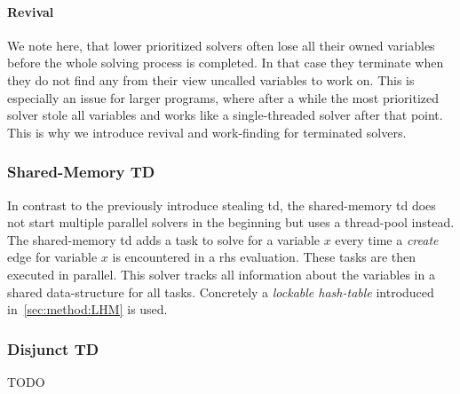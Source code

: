     \paragraph{Revival} We note here, that lower prioritized solvers often lose all their owned variables before the whole solving process is completed. In that case they terminate when they do not find any from their view uncalled variables to work on. This is especially an issue for larger programs, where after a while the most prioritized solver stole all variables and works like a single-threaded solver after that point. This is why we introduce revival and work-finding for terminated solvers.

    \subsubsection{Shared-Memory TD}
    \label{sec:method:td_parallel:sharedMem}
    In contrast to the previously introduce stealing \ac{td}, the shared-memory \ac{td} does not start multiple parallel solvers in the beginning but uses a thread-pool instead. The shared-memory \ac{td} adds a task to solve for a variable $x$ every time a \textit{create} edge for variable $x$ is encountered in a \ac{rhs} evaluation. These tasks are then executed in parallel.
    This solver tracks all information about the variables in a shared data-structure for all tasks. Concretely a \textit{lockable hash-table} introduced in~\autoref{sec:method:LHM} is used.

    \subsubsection{Disjunct TD}
    \label{sec:method:td_parallel:disjunct}
    TODO
